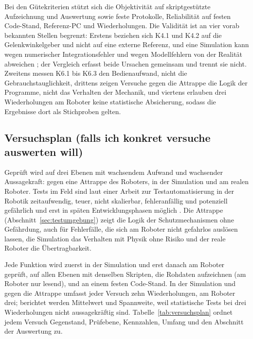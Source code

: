 Bei den Gütekriterien stützt sich die Objektivität auf skriptgestützte Aufzeichnung und Auswertung sowie feste Protokolle, Reliabilität auf festen Code-Stand, Referenz-PC und Wiederholungen.
Die Validität ist an vier vorab bekannten Stellen begrenzt: Erstens beziehen sich K4.1 und K4.2 auf die Gelenkwinkelgeber und nicht auf eine externe Referenz, und eine Simulation kann wegen numerischer Integrationsfehler und wegen Modellfehlern von der Realität abweichen \cite{Erez2015}; der Vergleich erfasst beide Ursachen gemeinsam und trennt sie nicht.
Zweitens messen K6.1 bis K6.3 den Bedienaufwand, nicht die Gebrauchstauglichkeit, drittens zeigen Versuche gegen die Attrappe die Logik der Programme, nicht das Verhalten der Mechanik, und viertens erlauben drei Wiederholungen am Roboter keine statistische Absicherung, sodass die Ergebnisse dort als Stichproben gelten.

\subsection{Versuchsplan (falls ich konkret versuche auswerten will)}
\label{sec:versuchsplan}
Geprüft wird auf drei Ebenen mit wachsendem Aufwand und wachsender Aussagekraft: gegen eine Attrappe des Roboters, in der Simulation und am realen Roboter.
Tests im Feld sind laut einer Arbeit zur Testautomatisierung in der Robotik zeitaufwendig, teuer, nicht skalierbar, fehleranfällig und potenziell gefährlich und erst in späten Entwicklungsphasen möglich \cite{Afzal2021}.
Die Attrappe (Abschnitt~\ref{sec:testumgebung}) zeigt die Logik der Schutzmechanismen ohne Gefährdung, auch für Fehlerfälle, die sich am Roboter nicht gefahrlos auslösen lassen, die Simulation das Verhalten mit Physik ohne Risiko und der reale Roboter die Übertragbarkeit.

Jede Funktion wird zuerst in der Simulation und erst danach am Roboter geprüft, auf allen Ebenen mit denselben Skripten, die Rohdaten aufzeichnen (am Roboter nur lesend), und an einem festen Code-Stand.
In der Simulation und gegen die Attrappe umfasst jeder Versuch zehn Wiederholungen, am Roboter drei; berichtet werden Mittelwert und Spannweite, weil statistische Tests bei drei Wiederholungen nicht aussagekräftig sind.
Tabelle~\ref{tab:versuchsplan} ordnet jedem Versuch Gegenstand, Prüfebene, Kennzahlen, Umfang und den Abschnitt der Auswertung zu.

